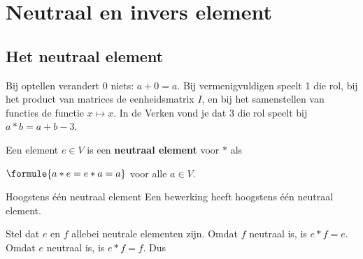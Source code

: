 
\begin{oefeningen}
\end{oefeningen}

\section{Neutraal en invers element}

\subsection{Het neutraal element}

Bij optellen verandert 0 niets: $a + 0 = a$. Bij vermenigvuldigen speelt 1 die rol, bij het product van matrices de eenheidsmatrix $I$, en bij het samenstellen van functies de functie $x \mapsto x$. In de Verken vond je dat 3 die rol speelt bij $a \ast b = a + b - 3$.

\begin{theorie}
Een element $e \in V$ is een \textbf{\textcolor{accent}{neutraal element}} voor $\ast$ als

\vspace{1mm}
\qquad $\formule{a \ast e = e \ast a = a}$ \qquad voor alle $a \in V$.

\begin{stelling}{Hoogstens één neutraal element}
Een bewerking heeft hoogstens één neutraal element.
\end{stelling}

\begin{bewijs}
Stel dat $e$ en $f$ allebei neutrale elementen zijn. Omdat $f$ neutraal is, is $e \ast f = e$. Omdat $e$ neutraal is, is $e \ast f = f$. Dus
\end{bewijs}
\end{theorie}

